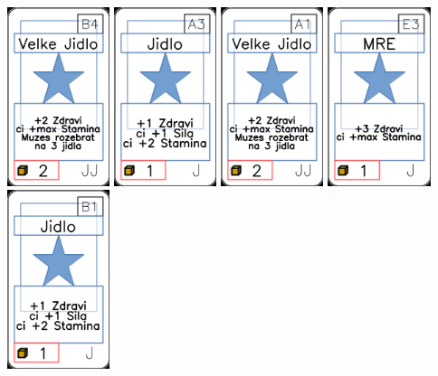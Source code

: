 \documentclass[a4paper]{article}
\begin{document}
	\includegraphics[width=3.0cm]{img-1_38}
	\includegraphics[width=3.0cm]{img-1_2}
	\includegraphics[width=3.0cm]{img-1_30}
	\includegraphics[width=3.0cm]{img-1_22}
	\includegraphics[width=3.0cm]{img-1_5}
\end{document}
